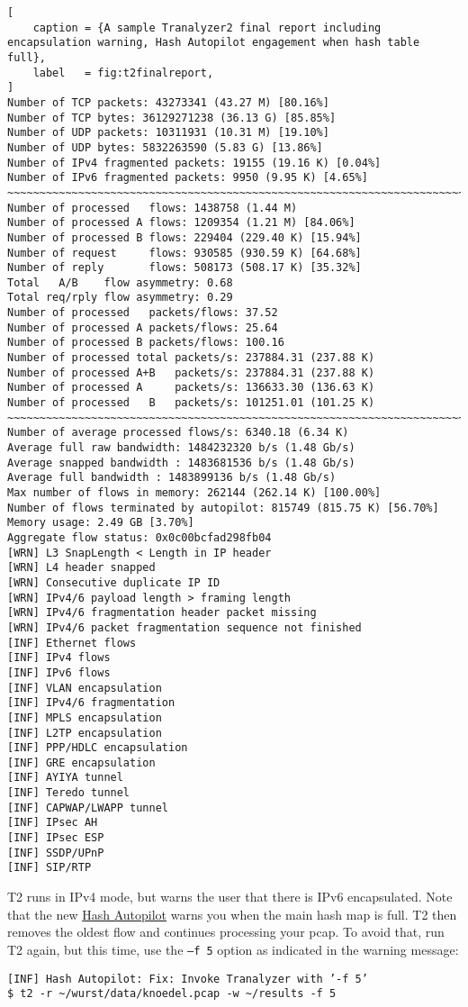 \begin{lstlisting}[
    caption = {A sample Tranalyzer2 final report including encapsulation warning, Hash Autopilot engagement when hash table full},
    label   = fig:t2finalreport,
]
Number of TCP packets: 43273341 (43.27 M) [80.16%]
Number of TCP bytes: 36129271238 (36.13 G) [85.85%]
Number of UDP packets: 10311931 (10.31 M) [19.10%]
Number of UDP bytes: 5832263590 (5.83 G) [13.86%]
Number of IPv4 fragmented packets: 19155 (19.16 K) [0.04%]
Number of IPv6 fragmented packets: 9950 (9.95 K) [4.65%]
~~~~~~~~~~~~~~~~~~~~~~~~~~~~~~~~~~~~~~~~~~~~~~~~~~~~~~~~~~~~~~~~~~~~~~~~~~~~~~~~
Number of processed   flows: 1438758 (1.44 M)
Number of processed A flows: 1209354 (1.21 M) [84.06%]
Number of processed B flows: 229404 (229.40 K) [15.94%]
Number of request     flows: 930585 (930.59 K) [64.68%]
Number of reply       flows: 508173 (508.17 K) [35.32%]
Total   A/B    flow asymmetry: 0.68
Total req/rply flow asymmetry: 0.29
Number of processed   packets/flows: 37.52
Number of processed A packets/flows: 25.64
Number of processed B packets/flows: 100.16
Number of processed total packets/s: 237884.31 (237.88 K)
Number of processed A+B   packets/s: 237884.31 (237.88 K)
Number of processed A     packets/s: 136633.30 (136.63 K)
Number of processed   B   packets/s: 101251.01 (101.25 K)
~~~~~~~~~~~~~~~~~~~~~~~~~~~~~~~~~~~~~~~~~~~~~~~~~~~~~~~~~~~~~~~~~~~~~~~~~~~~~~~~
Number of average processed flows/s: 6340.18 (6.34 K)
Average full raw bandwidth: 1484232320 b/s (1.48 Gb/s)
Average snapped bandwidth : 1483681536 b/s (1.48 Gb/s)
Average full bandwidth : 1483899136 b/s (1.48 Gb/s)
Max number of flows in memory: 262144 (262.14 K) [100.00%]
Number of flows terminated by autopilot: 815749 (815.75 K) [56.70%]
Memory usage: 2.49 GB [3.70%]
Aggregate flow status: 0x0c00bcfad298fb04
[WRN] L3 SnapLength < Length in IP header
[WRN] L4 header snapped
[WRN] Consecutive duplicate IP ID
[WRN] IPv4/6 payload length > framing length
[WRN] IPv4/6 fragmentation header packet missing
[WRN] IPv4/6 packet fragmentation sequence not finished
[INF] Ethernet flows
[INF] IPv4 flows
[INF] IPv6 flows
[INF] VLAN encapsulation
[INF] IPv4/6 fragmentation
[INF] MPLS encapsulation
[INF] L2TP encapsulation
[INF] PPP/HDLC encapsulation
[INF] GRE encapsulation
[INF] AYIYA tunnel
[INF] Teredo tunnel
[INF] CAPWAP/LWAPP tunnel
[INF] IPsec AH
[INF] IPsec ESP
[INF] SSDP/UPnP
[INF] SIP/RTP
\end{lstlisting}

T2 runs in IPv4 mode, but warns the user that there is IPv6 encapsulated.
Note that the new \hyperref[hash_autopilot]{Hash Autopilot} warns you when the main hash map is full.
T2 then removes the oldest flow and continues processing your pcap.
To avoid that, run T2 again, but this time, use the {\tt --f 5} option as indicated in the warning message:
\begin{center}
    {\tt [INF] Hash Autopilot: Fix: Invoke Tranalyzer with '-f 5'} \\
    {\tt \$ t2 -r \textasciitilde/wurst/data/knoedel.pcap -w \textasciitilde/results -f 5}
\end{center}

